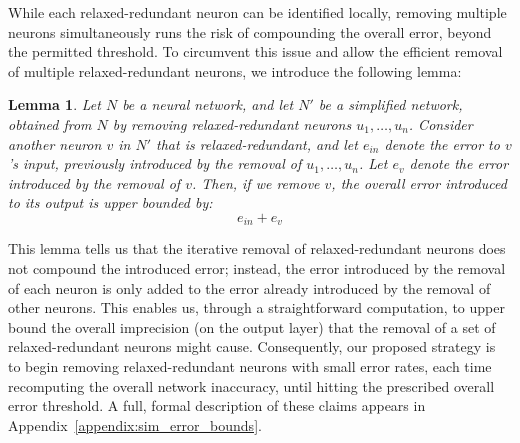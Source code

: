 \documentclass[10pt, conference, twocolumn, compsocconf]{IEEEtran}
\newtheorem{lemma}{Lemma}
\theoremstyle{remark}
\begin{document}
    

While each relaxed-redundant neuron can be identified locally,
removing multiple neurons simultaneously runs the risk of compounding
the overall error, beyond the permitted threshold.  To circumvent this
issue and allow the efficient removal of multiple relaxed-redundant
neurons, we introduce the following lemma:

\begin{lemma}
  Let $N$ be a neural network, and let $N'$ be a simplified  network,
  obtained from $N$ by removing relaxed-redundant neurons $u_1,\ldots,u_n$. Consider
  another neuron $v$ in $N'$ that is relaxed-redundant, and let $e_{in}$
  denote the error to $v$'s \emph{input}, previously introduced by the removal of
  $u_1,\ldots,u_n$. Let $e_v$ denote the error introduced by the
  removal of $v$. Then, if we remove $v$, the overall error introduced
  to its \emph{output} is upper bounded by:
\[
	e_{in} + e_v
\]
\end{lemma}

This lemma tells us that the iterative removal of relaxed-redundant
neurons does not compound the introduced error; instead, the error
introduced by the removal of each neuron is only added to the error
already introduced by the removal of other neurons.
This enables us, through a straightforward computation, to upper bound
the overall imprecision (on the output layer) that the removal of a
set of relaxed-redundant neurons might cause. Consequently, our
proposed strategy is to begin removing relaxed-redundant neurons with
small error rates, each time recomputing the overall network
inaccuracy, until hitting the prescribed overall error threshold.  A
full, formal description of these claims appears in
Appendix~\ref{appendix:sim_error_bounds}.
\end{document}
